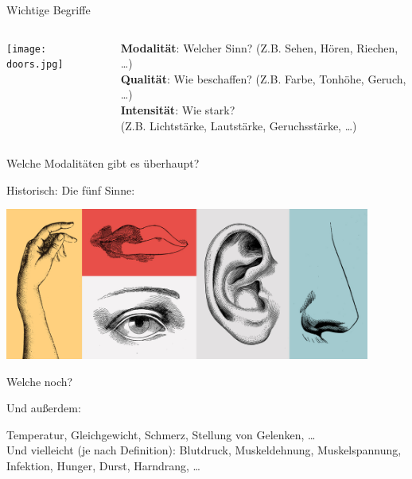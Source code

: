 \documentclass[aspectratio=169]{beamer}
\begin{document}
\begin{frame}{Wichtige Begriffe}
    
    \begin{columns}[c]
    \begin{column}{5cm}
\texttt{[image: doors.jpg]}    
    \end{column}
    
    \begin{column}{6cm}
    
    \textbf{Modalität}: Welcher Sinn? (Z.B. Sehen, Hören, Riechen, \dots) \\[0.2 cm]
    
    \textbf{Qualität}: Wie beschaffen? (Z.B. Farbe, Tonhöhe, Geruch, \dots) \\[0.2 cm]
    
    \textbf{Intensität}: Wie stark? \\ (Z.B. Lichtstärke, Lautstärke, Geruchsstärke, \dots) \\[0.2 cm]
    
    \end{column}
    \end{columns}
    
    
\end{frame}


\begin{frame}{Welche Modalitäten gibt es überhaupt?}

Historisch: Die fünf Sinne: 

\begin{center}
    \includegraphics[width=0.9\textwidth]{Five_Senses.jpg}
    
\end{center}



Welche noch?

\end{frame}



\begin{frame}{Und außerdem: }

Temperatur, Gleichgewicht, Schmerz, Stellung von Gelenken, \dots  \\[0.2 cm]



Und vielleicht (je nach Definition): Blutdruck, Muskeldehnung, Muskelspannung, Infektion, Hunger, Durst, Harndrang,  \dots 
\end{frame} 
\end{document}
